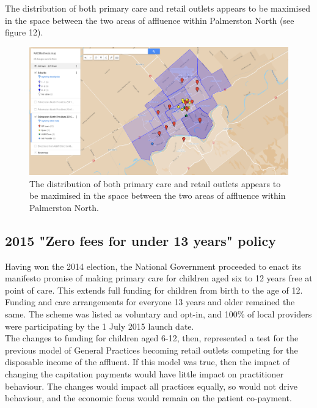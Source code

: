 \documentclass[11pt,a4paper]{article}
\begin{document}
The distribution of both primary care and retail outlets appears to be maximised in the space between the two areas of affluence within Palmerston North (see figure 12).\\


\begin{figure}[htp]
\centering
\includegraphics[scale=0.30]{fig12.png}
\caption{The distribution of both primary care and retail outlets appears to be maximised in the space between the two areas of affluence within Palmerston North.}
\label{Distribution of General Practitioners overlaid on suburb's social deprivation}
\end{figure}


\pagebreak
\subsection{2015 "Zero fees for under 13 years" policy}
Having won the 2014 election, the National Government proceeded to enact its manifesto promise of making primary care for children aged six to 12 years free at point of care. This extends full funding for children from birth to the age of 12. Funding and care arrangements for everyone 13 years and older remained the same. The scheme was listed as voluntary and opt-in, and  100\% of local providers were participating by the 1 July 2015 launch date.\\


The changes to funding for children aged 6-12, then, represented a test for the previous model of General Practices becoming retail outlets competing for the disposable income of the affluent. If this model was true, then the impact of changing the capitation payments would have little impact on practitioner behaviour. The changes would impact all practices equally, so would not drive behaviour, and the economic focus would remain on the patient co-payment.\\
\end{document}
